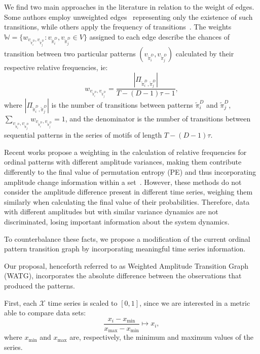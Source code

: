 \documentclass[paper=letter, fontsize=12pt]{article}
\begin{document}
We find two main approaches in the literature in relation to the weight of edges.
Some authors employ unweighted edges~\cite{Kulp2016ordinal,McCullough2015lagged} representing only the existence of such transitions, while others apply the frequency of transitions~\cite{Sorrentino2015periodic,Zhang2017ConstructingOP}.
The weights $\mathbb{W} = \{w_{v_{\widetilde{\pi}^D_i}, v_{\widetilde\pi^D_j}}: v_{\widetilde\pi^D_i}, v_{\widetilde\pi^D_j} \in V \}$ assigned to each edge describe the chances of transition between two particular patterns $(v_{\widetilde\pi^D_i}, v_{\widetilde\pi^D_j})$ calculated by their respective relative frequencies, ie:
\begin{equation}
w_{v_{\widetilde\pi^D_i}, v_{\widetilde\pi^D_j}} = \frac{|\Pi_{\widetilde\pi^D_i,\widetilde\pi^D_j}|}{T-(D-1)\tau-1},
\end{equation}
where $|\Pi_{\widetilde\pi^D_i,\widetilde\pi^D_j}|$ is the number of transitions between patterns $\widetilde\pi^D_i$ and $\widetilde\pi^D_j$, $\sum_{v_{\widetilde\pi^D_i}, v_{\widetilde\pi^D_j}}w_{v_{\widetilde\pi^D_i}, v_{\widetilde\pi^D_j}} = 1$,
and the denominator is the number of transitions between sequential patterns in the series of motifs of length $T-(D-1)\tau$.

Recent works propose a weighting in the calculation of relative frequencies for ordinal patterns with different amplitude variances, making them contribute differently to the final value of permutation entropy (PE) and thus incorporating amplitude change information within a set~\cite{Fadlallah2013Weightedpermutation}.
However, these methods do not consider the amplitude difference present in different time series, weighing them similarly when calculating the final value of their probabilities.
Therefore, data with different amplitudes but with similar variance dynamics are not discriminated, losing important information about the system dynamics.

To counterbalance these facts, we propose a modification of the current ordinal pattern transition graph by incorporating meaningful time series information.

Our proposal, henceforth referred to as Weighted Amplitude Transition Graph (WATG), incorporates the absolute difference between the observations that produced the patterns.

First, each $\mathcal{X}$ time series is scaled to $[0, 1]$, since we are interested in a metric able to compare data sets:
\begin{equation}
 \frac{x_i - x_{\min}}{x_{\max} - x_{\min}} \longmapsto x_i,
\end{equation}
where $x_{\min}$ and $x_{\max}$ are, respectively, the minimum and maximum values of the series.
\end{document}
